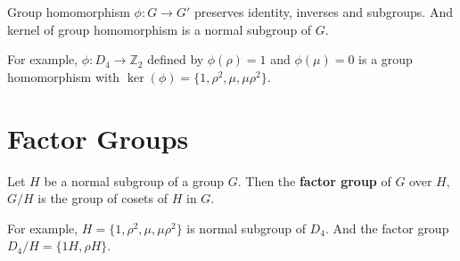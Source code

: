 \begin{remark}
	Group homomorphism $\phi : G \to G'$ preserves identity, inverses and subgroups.
	And kernel of group homomorphism is a normal subgroup of $G$.%
\end{remark}
\begin{remark}
	For example, $\phi : D_4 \to \mathbb{Z}_2$ defined by $\phi(\rho) = 1$ and $\phi(\mu) = 0$ is a group homomorphism with $\ker(\phi) = \{ 1,\rho^2,\mu,\mu\rho^2 \}$.
\end{remark}

\section{Factor Groups}
\begin{remark}
	Let $H$ be a normal subgroup of a group $G$.
	Then the \textbf{factor group} of $G$ over $H$, $G/H$ is the group of cosets of $H$ in $G$.
\end{remark}

\begin{remark}
	For example, $H = \{ 1,\rho^2,\mu,\mu\rho^2 \}$ is normal subgroup of $D_4$.
	And the factor group $D_4/H = \{ 1H,\rho H \}$.
\end{remark}

